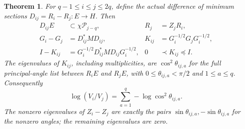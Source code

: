 \documentclass[11pt]{article}
\newcommand{\cP}{\mathcal P}
\newtheorem{theorem}{Theorem}
\begin{document}
\begin{theorem}
For $q-1\le i\le j\le2q$, define the actual difference of
minimum sections $D_{ij}=R_i-R_j:E\to H$. Then
\[
 \begin{aligned}
 D_{ij}E&\subset\chi\cP_{j-q},& R_j&=Z_jR_i,\\
 G_i-G_j&=D_{ij}^*M D_{ij},&
 K_{ij}&=G_i^{-1/2}G_jG_i^{-1/2},\\
 I-K_{ij}&=G_i^{-1/2}D_{ij}^*M D_{ij}G_i^{-1/2},&
 0&\prec K_{ij}\preceq I.
 \end{aligned}
 \tag{AGT5}
\]
The eigenvalues of $K_{ij}$, including multiplicities, are
$\cos^2\theta_{ij,a}$ for the full principal-angle list between
$R_iE$ and $R_jE$, with $0\le\theta_{ij,a}<\pi/2$ and
$1\le a\le q$. Consequently
\[
 \log(V_i/V_j)=\sum_{a=1}^q-\log\cos^2\theta_{ij,a}.
 \tag{AGT6}
\]
The nonzero eigenvalues of $Z_i-Z_j$ are exactly the pairs
$\sin\theta_{ij,a},-\sin\theta_{ij,a}$ for the nonzero angles;
the remaining eigenvalues are zero.
\end{theorem}
\end{document}
